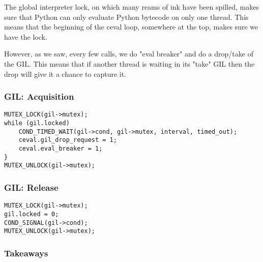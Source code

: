 The global interpreter lock,
on which many reams of ink have been spilled,
makes sure that Python can only evaluate Python bytecode
on only one thread.
This means that the beginning of the ceval loop,
somewhere at the top,
makes sure we have the lock.

However,
as we saw,
every few calls,
we do "eval breaker"
and do a drop/take of the GIL.
This means that if another thread is waiting in its
"take"
GIL then the drop will give it a chance to capture it.

\begin{frame}
\frametitle{GIL: Acquisition}
\begin{lstlisting}
MUTEX_LOCK(gil->mutex);
while (gil.locked)
    COND_TIMED_WAIT(gil->cond, gil->mutex, interval, timed_out);
    ceval.gil_drop_request = 1;
    ceval.eval_breaker = 1;
}
MUTEX_UNLOCK(gil->mutex);
\end{lstlisting}
\end{frame}

\begin{frame}
\frametitle{GIL: Release}
\begin{lstlisting}
MUTEX_LOCK(gil->mutex);
gil.locked = 0;
COND_SIGNAL(gil->cond);
MUTEX_UNLOCK(gil->mutex);
\end{lstlisting}
\end{frame}

\begin{frame}
\frametitle{Takeaways}
\end{frame}


